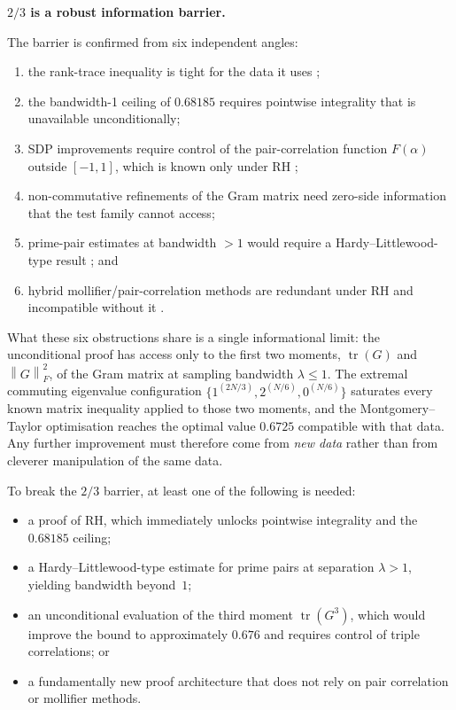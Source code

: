 \documentclass[11pt,a4paper]{article}
\theoremstyle{definition}
\theoremstyle{remark}
\newcommand{\tr}{\operatorname{tr}}
\newcommand{\norm}[1]{\left\|{#1}\right\|}
\begin{document}
\begin{center}
\textbf{$2/3$ is a robust information barrier.}
\end{center}

The barrier is confirmed from six independent angles:
\begin{enumerate}[label=(\roman*)]
    \item the rank-trace inequality is tight for the data it uses \cite{vonNeumann1937,Sylvester1852};
    \item the bandwidth-1 ceiling of $0.68185$ requires pointwise integrality that is unavailable unconditionally;
    \item SDP improvements require control of the pair-correlation function $F(\alpha)$ outside $[-1,1]$, which is known only under RH \cite{ChirreGoncalvesDeLaat2020};
    \item non-commutative refinements of the Gram matrix need zero-side information that the test family cannot access;
    \item prime-pair estimates at bandwidth $>1$ would require a Hardy--Littlewood-type result \cite{HardyLittlewood1923,BombieriVinogradov1965,ElliottHalberstam1968,BettinChandee2021}; and
    \item hybrid mollifier/pair-correlation methods are redundant under RH and incompatible without it \cite{BuiHeathBrown2013,RadziwillSoundararajan2013}.
\end{enumerate}

What these six obstructions share is a single informational limit: the unconditional proof has access only to the first two moments, $\tr(G)$ and $\norm{G}_F^2$, of the Gram matrix at sampling bandwidth $\lambda \le 1$. The extremal commuting eigenvalue configuration $\{1^{(2N/3)}, 2^{(N/6)}, 0^{(N/6)}\}$ saturates every known matrix inequality applied to those two moments, and the Montgomery--Taylor optimisation \cite{MontgomeryTaylor1974} reaches the optimal value $0.6725$ compatible with that data. Any further improvement must therefore come from \emph{new data} rather than from cleverer manipulation of the same data.

To break the $2/3$ barrier, at least one of the following is needed:
\begin{itemize}
    \item a proof of RH, which immediately unlocks pointwise integrality and the $0.68185$ ceiling;
    \item a Hardy--Littlewood-type estimate for prime pairs at separation $\lambda > 1$, yielding bandwidth beyond~$1$;
    \item an unconditional evaluation of the third moment $\tr(G^3)$, which would improve the bound to approximately $0.676$ and requires control of triple correlations; or
    \item a fundamentally new proof architecture that does not rely on pair correlation or mollifier methods.
\end{itemize}
\end{document}
